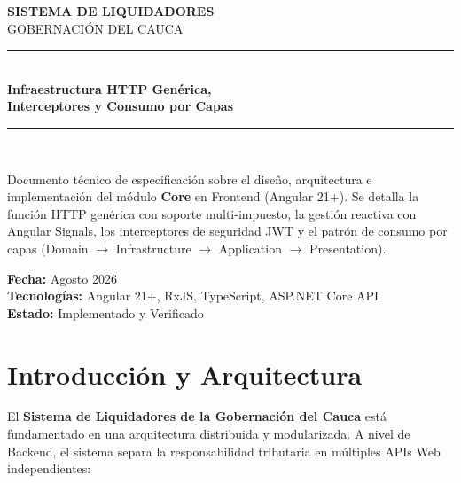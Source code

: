 \documentclass[12pt,a4paper]{article}
\begin{document}
\begin{titlepage}
    \centering
    \vspace*{1cm}
    
    {\Huge \bfseries \textcolor{primaryColor}{SISTEMA DE LIQUIDADORES}}\\[0.4cm]
    {\Large \textcolor{secondaryColor}{GOBERNACIÓN DEL CAUCA}}\\[1.5cm]
    
    \rule{\linewidth}{0.5mm}\\[0.4cm]
    {\huge \bfseries \textcolor{primaryColor}{Infraestructura HTTP Genérica,\\ Interceptores y Consumo por Capas}}\\[0.2cm]
    \rule{\linewidth}{0.5mm}\\[1.5cm]
    
    \begin{tcolorbox}[colframe=secondaryColor,colback=codeBg,arc=3mm,title=\textbf{Resumen Ejecutivo}]
        Documento técnico de especificación sobre el diseño, arquitectura e implementación del módulo \textbf{Core} en Frontend (Angular 21+). Se detalla la función HTTP genérica con soporte multi-impuesto, la gestión reactiva con Angular Signals, los interceptores de seguridad JWT y el patrón de consumo por capas (Domain $\rightarrow$ Infrastructure $\rightarrow$ Application $\rightarrow$ Presentation).
    \end{tcolorbox}
    
    \vfill
    
    {\large \textbf{Fecha:} Agosto 2026}\\[0.2cm]
    {\large \textbf{Tecnologías:} Angular 21+, RxJS, TypeScript, ASP.NET Core API}\\[0.2cm]
    {\large \textbf{Estado:} Implementado y Verificado}
    
    \vspace*{1cm}
\end{titlepage}

\tableofcontents
\newpage

\section{Introducción y Arquitectura}

El \textbf{Sistema de Liquidadores de la Gobernación del Cauca} está fundamentado en una arquitectura distribuida y modularizada. A nivel de Backend, el sistema separa la responsabilidad tributaria en múltiples APIs Web independientes:
\end{document}
